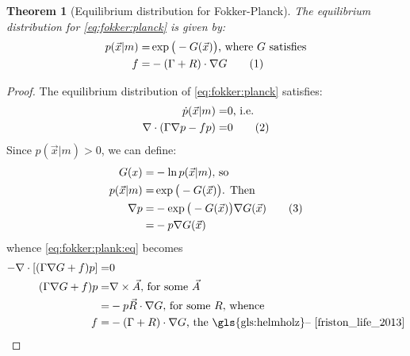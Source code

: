 \documentclass[]{article}
\newcommand\numberthis{\addtocounter{equation}{1}\tag{\theequation}}
\newtheorem{thm}{Theorem}
\begin{document}
\cite{friston_life_2013,friston2012free}

\begin{thm}[Equilibrium distribution for Fokker-Planck]
	The equilibrium distribution for \eqref{eq:fokker:planck} is given by:
	\begin{align*}
		p(\vec{x}\vert m) =& \exp \big(-G(\vec{x})\big) \text{, where $G$ satisfies}\\
		f =& -(\Gamma + R) \cdot \nabla G \numberthis \label{eq:f:Gamma:R}
	\end{align*}
	
\end{thm}
\begin{proof}
The equilibrium distribution of \eqref{eq:fokker:planck} satisfies:
	\begin{align*}
		\dot{p}(\vec{x}\vert m) =&0 \text{, i.e.}\\
		\nabla \cdot (\Gamma \nabla p -f p)=&0 \numberthis \label{eq:fokker:plank:eq}
	\end{align*}
	Since $	p(\vec{x}\vert m) > 0$, we can define:
	\begin{align*}
		G(x) =& - \ln{}p(\vec{x}\vert m) \text{, so}\\
		p(\vec{x}\vert m) =& \exp \big(-G(\vec{x})\big) \text{. Then}\\
		\nabla p =& - \exp \big(-G(\vec{x})\big) \nabla G(\vec{x}) \numberthis \label{eq:grad:p}\\
		=& - p \nabla G(\vec{x})
	\end{align*}
	 whence \eqref{eq:fokker:plank:eq} becomes
	\begin{align*}
		-\nabla \cdot [(\Gamma \nabla G +f)p]=&0\\
		(\Gamma \nabla G +f)p =& \nabla \times \vec{A} \text{, for some $\vec{A}$}\\
		=& -p \vec{R} \cdot \nabla G \text{, for some $R$, whence}\\
		f =& -(\Gamma + R) \cdot \nabla G \text{, the \gls{gls:helmholz}-- \cite[(2.3)]{friston_life_2013}}
	\end{align*}
\end{proof}
\end{document}
